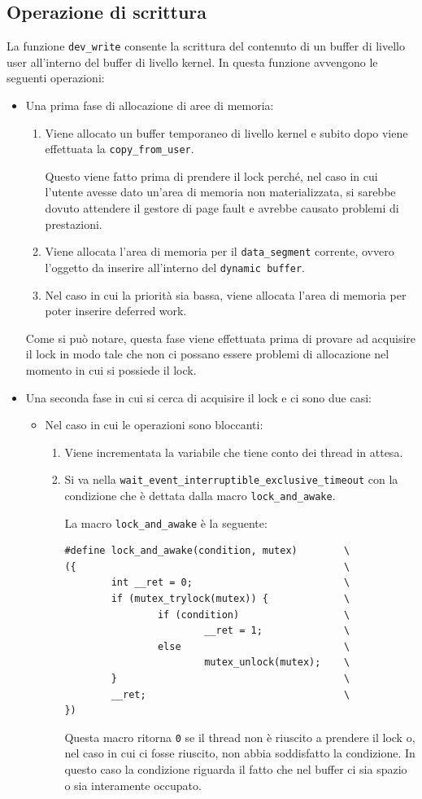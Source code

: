 \documentclass[oneside]{article}
\begin{document}
\subsection{Operazione di scrittura}
La funzione \texttt{dev\_write} consente la scrittura del contenuto di un buffer di livello user all'interno del buffer di livello kernel. In questa funzione avvengono le seguenti operazioni:
\begin{itemize}
\item Una prima fase di allocazione di aree di memoria:
\begin{enumerate}
\item Viene allocato un buffer temporaneo di livello kernel e subito dopo viene effettuata la \texttt{copy\_from\_user}.

Questo viene fatto prima di prendere il lock perché, nel caso in cui l'utente avesse dato un'area di memoria non materializzata, si sarebbe dovuto attendere il gestore di page fault e avrebbe causato problemi di prestazioni.
\item Viene allocata l'area di memoria per il \texttt{data\_segment} corrente, ovvero l'oggetto da inserire all'interno del \texttt{dynamic buffer}.
\item Nel caso in cui la priorità sia bassa, viene allocata l'area di memoria per poter inserire deferred work.
\end{enumerate}
Come si può notare, questa fase viene effettuata prima di provare ad acquisire il lock in modo tale che non ci possano essere problemi di allocazione nel momento in cui si possiede il lock.
\item Una seconda fase in cui si cerca di acquisire il lock e ci sono due casi:
\begin{itemize}
\item Nel caso in cui le operazioni sono bloccanti:
\begin{enumerate}
\item Viene incrementata la variabile che tiene conto dei thread in attesa.
\item Si va nella \texttt{wait\_event\_interruptible\_exclusive\_timeout} con la condizione che è dettata dalla macro \texttt{lock\_and\_awake}.

La macro \texttt{lock\_and\_awake} è la seguente:
\begin{lstlisting}[caption={Macro \texttt{lock\_and\_awake}},label={macrolock}]
#define lock_and_awake(condition, mutex)		\
({												\
        int __ret = 0;							\
        if (mutex_trylock(mutex)) {             \
                if (condition)                  \
                        __ret = 1;              \
                else                            \
                        mutex_unlock(mutex);    \
        }                                       \
        __ret;                                  \
})
\end{lstlisting}
Questa macro ritorna \texttt{0} se il thread non è riuscito a prendere il lock o, nel caso in cui ci fosse riuscito, non abbia soddisfatto la condizione. In questo caso la condizione riguarda il fatto che nel buffer ci sia spazio o sia interamente occupato.


\end{enumerate}
\end{itemize}
\end{itemize}
\end{document}

